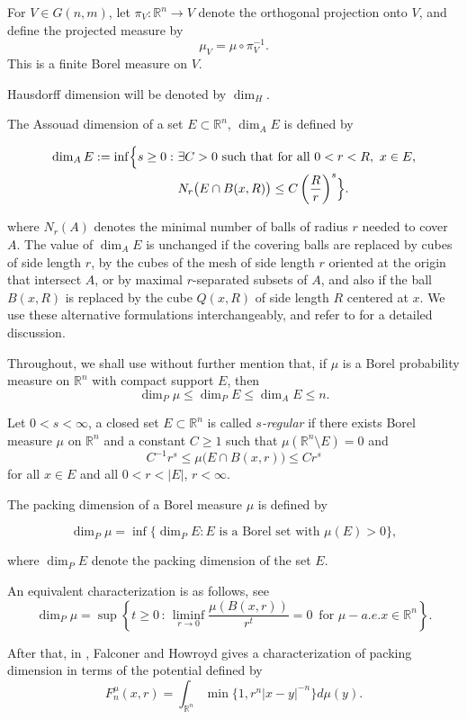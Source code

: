 \documentclass[12pt]{amsart}
\theoremstyle{definition}
\theoremstyle{remark}
\numberwithin{equation}{section}
\begin{document}
For $V\in G(n,m)$, let $\pi_V:\mathbb{R}^n\to V$ denote the orthogonal projection onto $V$, and define the projected measure by
\[
\mu_V=\mu\circ \pi_V^{-1}.
\]
This is a finite Borel measure on $V$.

Hausdorff dimension will be denoted by $\dim_H$. 

The Assouad dimension of a set $E\subset\mathbb{R}^n$, $\dim_A E$ is defined by


\begin{align*}
\dim_A E := \inf \Bigl\{ s \ge 0 :\ &\exists C>0 \text{ such that for all } 0<r<R,\ x\in E,\\
&N_r\bigl(E \cap B(x,R)\bigr)
\le C \left(\frac{R}{r}\right)^s
\Bigr\}.
\end{align*}


where $N_r(A)$ denotes the minimal number of balls of radius $r$ needed
to cover $A$. The value of $\dim_A E$ is unchanged if the covering balls
are replaced by cubes of side length $r$, by the cubes of the mesh of
side length $r$ oriented at the origin that intersect $A$, or by maximal
$r$-separated subsets of $A$, and also if the ball $B(x,R)$ is replaced
by the cube $Q(x,R)$ of side length $R$ centered at $x$. We use these alternative formulations interchangeably, and
refer to \cite{fraser2020assouad} for a detailed discussion.

Throughout, we shall use without further mention that, if $\mu$ is a
Borel probability measure on $\mathbb{R}^n$ with compact support
$E$, then
$$\dim_P\mu\leq\dim_P E\leq\dim_A E\leq n.$$

Let $0<s<\infty$, a closed set $E\subset\mathbb{R}^n$ is called \emph{$s$-regular} if there exists Borel measure $\mu$ on $\mathbb{R}^n$ and a constant $C\ge 1$ such that $\mu(\mathbb{R}^n\setminus E)=0$ and
\[
C^{-1} r^s \le \mu\bigl(E\cap B(x,r)\bigr)
\le C r^s
\]
for all $x\in E$ and all $0<r<|E|$, $r<\infty$.


The packing dimension of a Borel measure $\mu$ is defined by

\[
\dim_P \mu = \inf\{ \dim_P E : E \text{ is a Borel set with }\mu(E) > 0 \},
\]

where $\dim_P E$ denote the packing dimension of the set $E$.


An equivalent characterization is as follows, see \cite[Lemma 4.1]{hu1994fractal}
\[
\dim_P \mu =\sup \left\{ t\geq 0\, :\, \liminf_{r \to 0} \frac{\mu(B(x,r))}{r^t} = 0 \, \text{ for }\mu-a.e.x\in\mathbb{R}^n\right\}.
\]

After that, in \cite{falconer1997packing}, Falconer and Howroyd gives a characterization of packing dimension in terms of the potential defined by 
$$F_n^\mu (x,r)=\int_{\mathbb{R}^n} \min \{1,r^n|x-y|^{-n}\}d\mu(y).$$
\end{document}
